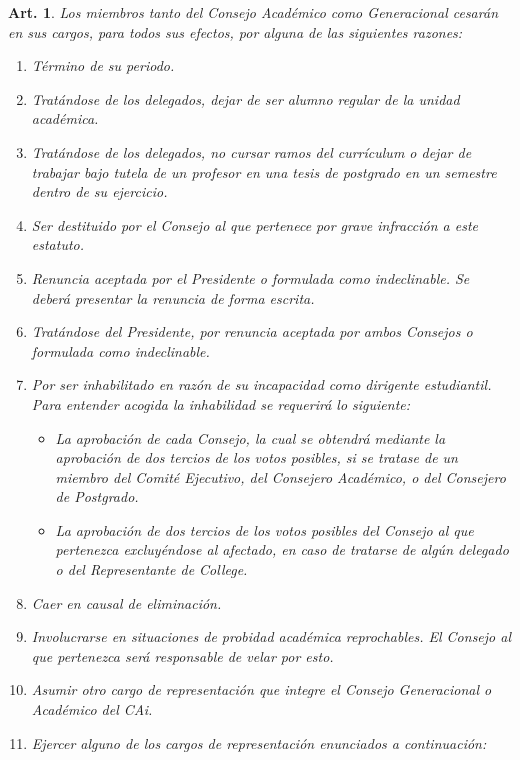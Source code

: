 \documentclass[letterpaper,11pt]{article}
\theoremstyle{plain}
\newtheorem{art}{Art.} %
\begin{document}
		\begin{art}\label{ceseCargo}
			Los miembros tanto del Consejo Académico como Generacional cesarán en sus cargos, para todos sus efectos, por alguna de las siguientes razones:
			\begin{enumerate}
				\item Término de su periodo.
				\item\label{alumno_regular} Tratándose de los delegados, dejar de ser alumno regular de la unidad académica.
				\item\label{sin_ramos} Tratándose de los delegados, no cursar ramos del currículum o dejar de trabajar bajo tutela de un profesor en una tesis de postgrado en un semestre dentro de su ejercicio.
				\item\label{destitucion} Ser destituido por el Consejo al que pertenece por grave infracción a este estatuto.
				\item\label{renuncia} Renuncia aceptada por el Presidente o formulada como indeclinable. Se deberá presentar la renuncia de forma escrita.
				\item Tratándose del Presidente, por renuncia aceptada por ambos Consejos o formulada como indeclinable.
				\item\label{inhabilitacion} Por ser inhabilitado en razón de su incapacidad como dirigente estudiantil. Para entender acogida la inhabilidad se requerirá lo siguiente:
					\begin{itemize}
						\item La aprobación de cada Consejo, la cual se obtendrá mediante la aprobación de dos tercios de los votos posibles, si se tratase de un miembro del Comité Ejecutivo, del Consejero Académico, o del Consejero de Postgrado.
						\item La aprobación de dos tercios de los votos posibles del Consejo al que pertenezca excluyéndose al afectado, en caso de tratarse de algún delegado o del Representante de College.
					\end{itemize}
				\item\label{causal} Caer en causal de eliminación.
				\item Involucrarse en situaciones de probidad académica reprochables. El Consejo al que pertenezca será responsable de velar por esto.
				\item Asumir otro cargo de representación que integre el Consejo Generacional o Académico del CAi.
				\item Ejercer alguno de los cargos de representación enunciados a continuación:

\end{enumerate}
\end{art}
\end{document}
